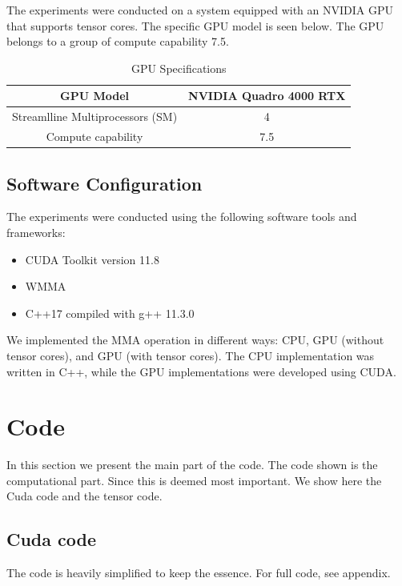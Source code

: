 \documentclass[conference]{IEEEtran}
\begin{document}
  The experiments were conducted on a system equipped with an NVIDIA GPU that supports tensor cores.
  The specific GPU model is seen below. The GPU belongs to a group of compute capability 7.5. 
  
  \begin{table}[htbp]
  \caption{GPU Specifications\cite{Voltatuningguide}}
  \centering
    \begin{tabular}{|c|c|}
    \hline
    GPU Model & NVIDIA Quadro 4000 RTX \\
    \hline
    Streamlline Multiprocessors (SM) & 4 \\
    \hline
    Compute capability & 7.5 \\
    \hline
    
  \end{tabular}
  \end{table}
  
  \subsection{Software Configuration}\label{sec:software-configuration}
  
  The experiments were conducted using the following software tools and frameworks:
  
  \begin{itemize}
    \item CUDA Toolkit version 11.8
    \item WMMA
    \item C++17 compiled with g++ 11.3.0
  \end{itemize}
  
  We implemented the MMA operation in different ways: CPU, GPU (without tensor cores), and GPU (with tensor cores). 
  The CPU implementation was written in C++, while the GPU implementations were developed using CUDA.

  
  \section{Code}
  In this section we present the main part of the code. The code shown is the computational part. Since this is
  deemed most important. We show here the Cuda code and the tensor code.

  \subsection{Cuda code}\label{sec:CudaCode}
  The code is heavily simplified to keep the essence. For full code, see appendix.
\end{document}
